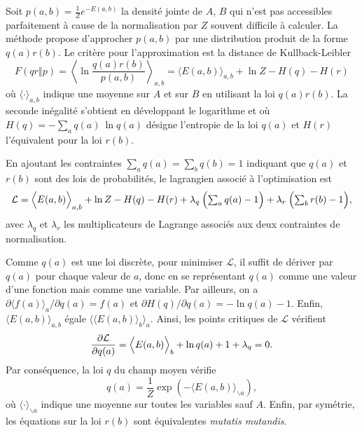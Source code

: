 \documentclass[a4paper,11pt,oneside]{article}
\let\<\langle
\let\>\rangle
\begin{document}
Soit $p(a,b) = \frac1Ze^{-E(a,b)}$ la densité jointe de $A$,
$B$ qui n'est pas accessibles parfaitement à cause de la
normalisation par $Z$ souvent difficile à calculer. La
méthode propose d'approcher $p(a,b)$ par une distribution
produit de la forme $q(a)r(b)$. Le critère pour
l'approximation est la distance de Kullback-Leibler
\begin{equation}
  \label{eq:19}
  F(qr{\mathop\Vert}p)
  = \left\<\ln\frac{q(a)r(b)}{p(a,b)}\right\>_{a,b}
  = \bigl\< E(a,b)\bigr\>_{a,b} + \ln Z - H(q) - H(r)
\end{equation}
où $\<\cdot\>_{a, b}$ indique une moyenne sur $A$ et sur $B$
en utilisant la loi $q(a)r(b)$. La seconde inégalité
s'obtient en développant le logarithme et où $H(q)
= -\sum_aq(a)\:\ln q(a)$ désigne l'entropie de la loi $q(a)$
et $H(r)$ l'équivalent pour la loi $r(b)$.

En ajoutant les contraintes $\sum_a q(a) = \sum_b q(b) = 1$
indiquant que $q(a)$ et $r(b)$ sont des lois de
probabilités, le lagrangien associé à l'optimisation est
\begin{equation}
  \label{eq:20}
  \mathcal L = \Bigl\< E(a,b)\Bigr\>_{a,b}
  + \ln Z - H(q) - H(r)
  + \lambda_q\:\Bigl(\textstyle\sum_a q(a) - 1\Bigr)
  + \lambda_r\:\Bigl(\textstyle\sum_b r(b) - 1\Bigr),
\end{equation}
avec $\lambda_q$ et $\lambda_r$ les multiplicateurs de
Lagrange associés aux deux contraintes de normalisation.

Comme $q(a)$ est une loi discrète, pour minimiser $\mathcal
L$, il suffit de dériver par $q(a)$ pour chaque valeur de
$a$, donc en se représentant $q(a)$ comme une valeur d'une
fonction mais comme une variable. Par ailleurs, on
a $\partial \< f(a)\>_a /\partial q(a) = f(a)$ et $\partial
H(q) /\partial q(a) = -\ln q(a) - 1$. Enfin, $\< E(a,b)
\>_{a,b}$ égale $\bigl\< \< E(a,b) \>_b \bigr\>_a$. Ainsi,
les points critiques de $\mathcal L$ vérifient
\begin{equation}
  \label{eq:21}
  \frac{\partial\mathcal L}{\partial q(a)}
  = \Bigl\< E(a,b)\Bigr\>_b + \ln q(a) +1+\lambda_q
  = 0.
\end{equation}
Par conséquence, la loi $q$ du champ moyen vérifie
\begin{equation}
  q(a) =
  \frac1Z
  \exp\left(-\bigl\< E(a,b)
             \bigr\>_{\backslash a}
      \right),
\end{equation}
où $\< \cdot\>_{\backslash a}$ indique une moyenne sur
toutes les variables sauf $A$. Enfin, par symétrie, les
équations sur la loi $r(b)$ sont équivalentes \emph{mutatis
  mutandis}.
\end{document}
